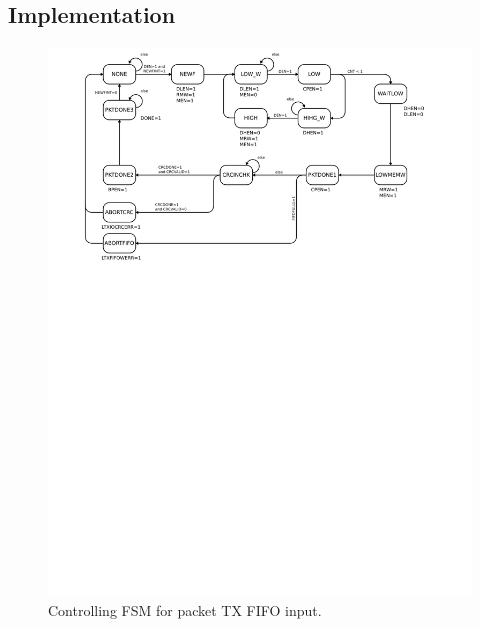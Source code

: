\subsection{Implementation}
\begin{figure}
\label{txinputfsm}
\includegraphics[scale=0.7]{txinput.fsm.svg}
\caption{Controlling FSM for packet TX FIFO input.}
\end{figure}

